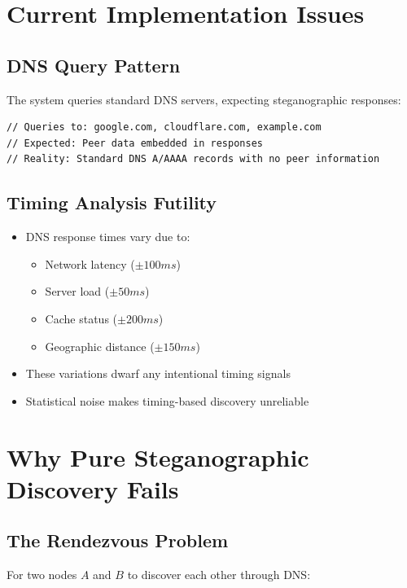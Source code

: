 \documentclass[12pt,a4paper]{article}
\begin{document}
\section{Current Implementation Issues}

\subsection{DNS Query Pattern}

The system queries standard DNS servers, expecting steganographic responses:

\begin{lstlisting}
// Queries to: google.com, cloudflare.com, example.com
// Expected: Peer data embedded in responses
// Reality: Standard DNS A/AAAA records with no peer information
\end{lstlisting}

\subsection{Timing Analysis Futility}

\begin{itemize}
    \item DNS response times vary due to:
    \begin{itemize}
        \item Network latency ($\pm 100ms$)
        \item Server load ($\pm 50ms$)
        \item Cache status ($\pm 200ms$)
        \item Geographic distance ($\pm 150ms$)
    \end{itemize}
    \item These variations dwarf any intentional timing signals
    \item Statistical noise makes timing-based discovery unreliable
\end{itemize}

\section{Why Pure Steganographic Discovery Fails}

\subsection{The Rendezvous Problem}

For two nodes $A$ and $B$ to discover each other through DNS:
\end{document}
